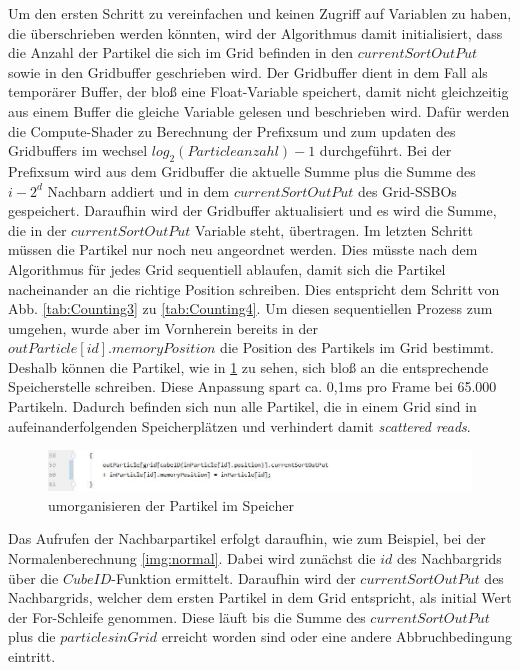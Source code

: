 \documentclass[intern,palatino]{cgBA}
\begin{document}
Um den ersten Schritt zu vereinfachen und keinen Zugriff auf Variablen zu haben, die überschrieben werden könnten, wird der Algorithmus damit initialisiert, dass die Anzahl der Partikel die sich im Grid befinden in den $currentSortOutPut$ sowie in den Gridbuffer geschrieben wird.
\newline
Der Gridbuffer dient in dem Fall als temporärer Buffer, der bloß eine Float-Variable speichert, damit nicht gleichzeitig aus einem Buffer die gleiche Variable gelesen und beschrieben wird.
Dafür werden die Compute-Shader zu Berechnung der Prefixsum und zum updaten des Gridbuffers im wechsel $log_2(Particleanzahl)-1$ durchgeführt. Bei der Prefixsum wird aus dem Gridbuffer die aktuelle Summe plus die Summe des $i - 2^d$ Nachbarn addiert und in dem $currentSortOutPut$ des Grid-SSBOs gespeichert. Daraufhin wird der Gridbuffer aktualisiert und es wird die Summe, die in der $currentSortOutPut$ Variable steht, übertragen.
\newline
Im letzten Schritt müssen die Partikel nur noch neu angeordnet werden. Dies müsste nach dem Algorithmus für jedes Grid sequentiell ablaufen, damit sich die Partikel nacheinander an die richtige Position schreiben. Dies entspricht dem Schritt von Abb. \ref{tab:Counting3} zu \ref{tab:Counting4}.
\newline
Um diesen sequentiellen Prozess zum umgehen, wurde aber im Vornherein bereits in der $outParticle[id].memoryPosition$ die Position des Partikels im Grid bestimmt. Deshalb können die Partikel, wie in \ref{img:rearrange} zu sehen, sich bloß an die entsprechende Speicherstelle schreiben. Diese Anpassung spart ca. 0,1ms pro Frame bei 65.000 Partikeln. Dadurch befinden sich nun alle Partikel, die in einem Grid sind in aufeinanderfolgenden Speicherplätzen und verhindert damit \textit{scattered reads}.

\begin{figure}[H]
	\centering
	\includegraphics[width=1.3\columnwidth]{Bilder/rearrange.jpg}
	\caption{umorganisieren der Partikel im Speicher}
	\label{img:rearrange}
\end{figure}

Das Aufrufen der Nachbarpartikel erfolgt daraufhin, wie zum Beispiel, bei der Normalenberechnung \ref{img:normal}. Dabei wird zunächst die $id$ des Nachbargrids über die $CubeID$-Funktion ermittelt. Daraufhin wird der $currentSortOutPut$ des Nachbargrids, welcher dem ersten Partikel in dem Grid entspricht, als initial Wert der For-Schleife genommen. Diese läuft bis die Summe des $currentSortOutPut$ plus die $particlesinGrid$ erreicht worden sind oder eine andere Abbruchbedingung eintritt.
\end{document}
